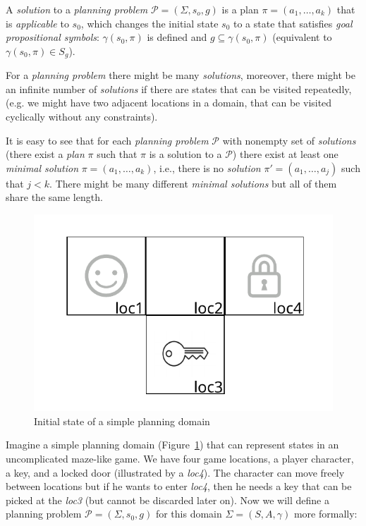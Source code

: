 \begin{defn}\label{def01:4}
    A \emph{solution} to a \emph{planning problem} $\mathcal{P}=(\Sigma,s_o,g)$ is a plan $\pi=(a_1,\dots,a_k)$ that is \emph{applicable} to $s_0$, which changes the initial state $s_0$ to a state that satisfies \emph{goal propositional symbols}: $\gamma(s_0,\pi)$ is defined and $g \subseteq \gamma(s_0,\pi)$ (equivalent to $\gamma(s_0,\pi) \in S_g$).
\end{defn}

\noindent
For a \emph{planning problem} there might be many \emph{solutions}, moreover, there might be an infinite number of \emph{solutions} if there are states that can be visited repeatedly, (e.g. we might have two adjacent locations in a domain, that can be visited cyclically without any constraints).

\medbreak\noindent
It is easy to see that for each \emph{planning problem} $\mathcal{P}$ with nonempty set of \emph{solutions} (there exist a \emph{plan} $\pi$ such that $\pi$ is a solution to a $\mathcal{P}$) there exist at least one \emph{minimal solution} $\pi=(a_1,\dots,a_k)$, i.e., there is no \emph{solution} $\pi'=(a_1,\dots,a_j)$ such that $j < k$. There might be many different \emph{minimal solutions} but all of them share the same length.


\begin{example}\label{ex01:1}
    \begin{figure}
        \centering
        \includegraphics{img/output_mares_key1.pdf}
        \caption{Initial state of a simple planning domain}
        \label{fig01:1}
    \end{figure}
    
    Imagine a simple planning domain (Figure~\ref{fig01:1}) that can represent states in an uncomplicated maze-like game. We have four game locations, a player character, a key, and a locked door (illustrated by a \emph{loc4}). The character can move freely between locations but if he wants to enter \emph{loc4}, then he needs a key that can be picked at the \emph{loc3} (but cannot be discarded later on). Now we will define a planning problem $\mathcal{P}=(\Sigma,s_0,g)$ for this domain $\Sigma=(S,A,\gamma)$ more formally:
    
\end{example}

